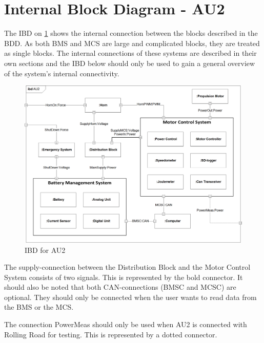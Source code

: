 \section{Internal Block Diagram - AU2}
The IBD on \ref{fig:IBD} shows the internal connection between the blocks described in the BDD. As both BMS and MCS are large and complicated blocks, they are treated as single blocks. The internal connections of these systems are described in their own sections and the IBD below should only be used to gain a general overview of the system's internal connectivity. 
\begin{figure}[H]
	\centering
	\includegraphics[width=1\linewidth]{Architecture/Diagrams/IBD_AU2}
	\caption{IBD for AU2}
	\label{fig:IBD}
\end{figure}

The supply-connection between the Distribution Block and the Motor Control System consists of two signals. This is represented by the bold connector. It should also be noted that both CAN-connections (BMSC and MCSC) are optional. They should only be connected when the user wants to read data from the BMS or the MCS.

The connection PowerMeas should only be used when AU2 is connected with Rolling Road for testing. This is represented by a dotted connector.